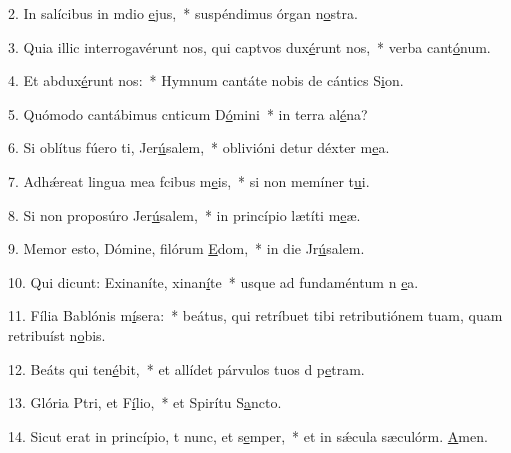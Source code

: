 2. In salícibus in mdio \uline{e}jus,~* suspéndimus órgan n\uline{o}stra.\par 
3. Quia illic interrogavérunt nos, qui captvos dux\uline{é}runt nos,~* verba cant\uline{ó}num.\par 
4. Et  abdux\uline{é}runt nos:~* Hymnum cantáte nobis de cántics S\uline{i}on.\par 
5. Quómodo cantábimus cnticum D\uline{ó}mini~* in terra al\uline{é}na?\par 
6. Si oblítus fúero ti, Jer\uline{ú}salem,~* oblivióni detur déxter m\uline{e}a.\par 
7. Adhǽreat lingua mea fcibus m\uline{e}is,~* si non memíner t\uline{u}i.\par 
8. Si non proposúro Jer\uline{ú}salem,~* in princípio lætíti m\uline{e}æ.\par 
9. Memor esto, Dómine, filórum \uline{E}dom,~* in die Jr\uline{ú}salem.\par 
10. Qui dicunt: Exinaníte, xinan\uline{í}te~* usque ad fundaméntum n \uline{e}a.\par 
11. Fília Bablónis m\uline{í}sera:~* beátus, qui retríbuet tibi retributiónem tuam, quam retribuíst n\uline{o}bis.\par 
12. Beáts qui ten\uline{é}bit,~* et allídet párvulos tuos d p\uline{e}tram.\par 
13. Glória Ptri, et F\uline{í}lio,~* et Spirítu S\uline{a}ncto.\par 
14. Sicut erat in princípio, t nunc, et s\uline{e}mper,~* et in sǽcula sæculórm. \uline{A}men.\par 

